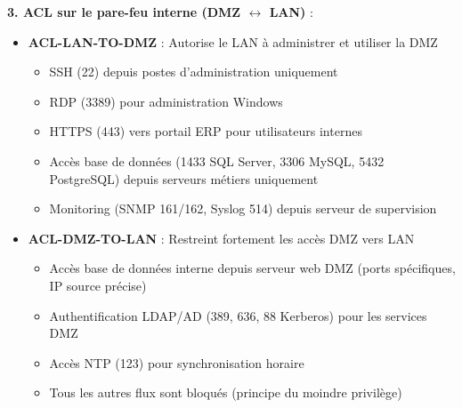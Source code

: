 \noindent \textbf{3. ACL sur le pare-feu interne (DMZ $\leftrightarrow$ LAN)} :\\
\begin{itemize}
  \item \textbf{ACL-LAN-TO-DMZ} : Autorise le LAN à administrer et utiliser la DMZ
  \begin{itemize}
    \item SSH (22) depuis postes d'administration uniquement
    \item RDP (3389) pour administration Windows
    \item HTTPS (443) vers portail ERP pour utilisateurs internes
    \item Accès base de données (1433 SQL Server, 3306 MySQL, 5432 PostgreSQL) depuis serveurs métiers uniquement
    \item Monitoring (SNMP 161/162, Syslog 514) depuis serveur de supervision
  \end{itemize}
  
  \item \textbf{ACL-DMZ-TO-LAN} : Restreint fortement les accès DMZ vers LAN
  \begin{itemize}
    \item Accès base de données interne depuis serveur web DMZ (ports spécifiques, IP source précise)
    \item Authentification LDAP/AD (389, 636, 88 Kerberos) pour les services DMZ
    \item Accès NTP (123) pour synchronisation horaire
    \item Tous les autres flux sont bloqués (principe du moindre privilège)
  \end{itemize}
\end{itemize}

\medskip

